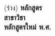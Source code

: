 \pagestyle{empty}
\begin{center}
(ร่าง)\vfill\vspace{-3cm}
{\bfseries \LARGE
หลักสูตร\thdegree\\
สาขาวิชา\thdegreebranch\\[5mm]
หลักสูตรใหม่ พ.ศ. \bdyear
}
\vfill
{\Large
\department\\
\faculty\\
\university\\
}
\end{center}